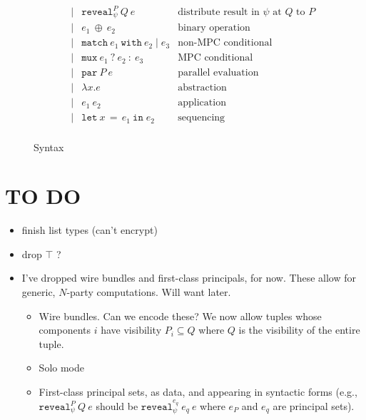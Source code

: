 \documentclass[10pt]{article}
\newcommand{\kw}[1]{\ensuremath{\mathtt{#1}}}
\newcommand{\ebinop}[2]{\ensuremath{{#1}~\oplus~{#2}}}
\newcommand{\elet}[3]{\ensuremath{\kw{let}~#1\, =\, #2~\kw{in}\;{#3}}}
\newcommand{\epar}[2]{\ensuremath{\kw{par}~{#1}~{#2}}}
\newcommand{\esec}[2]{\ensuremath{\kw{sec}~{#1}~{#2}}}
\newcommand{\ereveal}[4]{\ensuremath{\kw{reveal}^{#1}_{#4}~{#2}~{#3}}}
\newcommand{\econd}[3]{\ensuremath{\kw{match}~{#1}~\kw{with}~{#2} \mid {#3}}}
\newcommand{\emux}[3]{\ensuremath{\kw{mux}~{#1}~\kw{?}~{#2}~\kw{:}~{#3}}}
\newcommand{\elam}[2]{\ensuremath{\lambda {#1}.{#2}}}
\newcommand{\eapp}[2]{\ensuremath{{#1}~{#2}}}
\begin{document}
\begin{figure}[h]
\[\begin{array}{rlcll}
                       && \mid & \ereveal{P}{Q}{e}{\psi} & \text{distribute result in $\psi$ at $Q$ to $P$}\\
                       && \mid & \ebinop{e_1}{e_2}  & \text{binary operation} \\
                       && \mid & \econd{e_1}{e_2}{e_3}  & \text{non-MPC conditional} \\
                       && \mid & \emux{e_1}{e_2}{e_3}  & \text{MPC conditional} \\
                       && \mid & \epar{P}{e} & \text{parallel evaluation}\\
                       && \mid & \elam{x}{e}  & \text{abstraction} \\
                       && \mid & \eapp{e_1}{e_2}  & \text{application} \\
                       && \mid & \elet{x}{e_1}{e_2}  & \text{sequencing} \\
  \end{array}
  \]
  \caption{Syntax}
  \label{fig:syntax}
\end{figure}

\section{TO DO}

\begin{itemize}
\item finish list types (can't encrypt) 
\item drop $\top$ ?
\item I've dropped wire bundles and first-class principals, for
  now. These allow for generic, $N$-party computations. Will want
  later.
  \begin{itemize}
  \item Wire bundles. Can we encode these? We now allow tuples whose
    components $i$ have visibility $P_i \subseteq Q$ where $Q$ is the
    visibility of the entire tuple.
  \item Solo mode
  \item First-class principal sets, as data, and appearing in
    syntactic forms (e.g., $\ereveal{P}{Q}{e}{\psi}$ should be
    $\ereveal{e_q}{e_q}{e}{\psi}$ where $e_P$ and $e_q$ are principal sets).
  \end{itemize}
\end{itemize}
\end{document}
